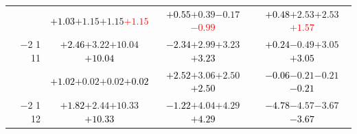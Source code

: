 \documentclass[compress]{beamer}
\begin{document}
\begin{frame}
\begin{tabular}{r | c | c | c}
          & \textcolor{black}{$+1.03$}\hspace{0.1 cm}$+1.15$\hspace{0.1 cm}$+1.15$\hspace{0.1 cm}\textcolor{red}{$+1.15$} & \textcolor{black}{$+0.55$}\hspace{0.1 cm}$+0.39$\hspace{0.1 cm}$-0.17$\hspace{0.1 cm}\textcolor{red}{$-0.99$} & \textcolor{black}{$+0.48$}\hspace{0.1 cm}$+2.53$\hspace{0.1 cm}$+2.53$\hspace{0.1 cm}\textcolor{red}{$+1.57$} \\
$-$2 1 11 & \textcolor{black}{$+2.46$}\hspace{0.1 cm}$+3.22$\hspace{0.1 cm}$+10.04$\hspace{0.1 cm}\textcolor{black}{$+10.04$} & \textcolor{black}{$-2.34$}\hspace{0.1 cm}$+2.99$\hspace{0.1 cm}$+3.23$\hspace{0.1 cm}\textcolor{black}{$+3.23$} & \textcolor{black}{$+0.24$}\hspace{0.1 cm}$-0.49$\hspace{0.1 cm}$+3.05$\hspace{0.1 cm}\textcolor{black}{$+3.05$} \\
          & \textcolor{black}{$+1.02$}\hspace{0.1 cm}$+0.02$\hspace{0.1 cm}$+0.02$\hspace{0.1 cm}\textcolor{black}{$+0.02$} & \textcolor{black}{$+2.52$}\hspace{0.1 cm}$+3.06$\hspace{0.1 cm}$+2.50$\hspace{0.1 cm}\textcolor{black}{$+2.50$} & \textcolor{black}{$-0.06$}\hspace{0.1 cm}$-0.21$\hspace{0.1 cm}$-0.21$\hspace{0.1 cm}\textcolor{black}{$-0.21$} \\
$-$2 1 12 & \textcolor{black}{$+1.82$}\hspace{0.1 cm}$+2.44$\hspace{0.1 cm}$+10.33$\hspace{0.1 cm}\textcolor{black}{$+10.33$} & \textcolor{black}{$-1.22$}\hspace{0.1 cm}$+4.04$\hspace{0.1 cm}$+4.29$\hspace{0.1 cm}\textcolor{black}{$+4.29$} & \textcolor{black}{$-4.78$}\hspace{0.1 cm}$-4.57$\hspace{0.1 cm}$-3.67$\hspace{0.1 cm}\textcolor{black}{$-3.67$} \\

\end{tabular}
\end{frame}
\end{document}
